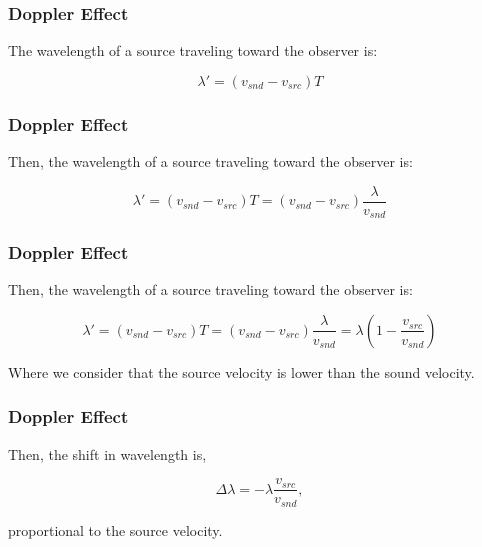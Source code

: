 \documentclass[]{beamer}
\begin{document}

\begin{frame}
\frametitle{Doppler Effect}


The wavelength of a source traveling toward the observer is:

\begin{equation}
\lambda'=(v_{snd}-v_{src})T
\end{equation}


  \end{frame}

\begin{frame}
\frametitle{Doppler Effect}


Then, the wavelength of a source traveling toward the observer is:

\begin{equation}
\lambda'=(v_{snd}-v_{src})T=(v_{snd}-v_{src})\frac{\lambda}{v_{snd}}
\end{equation}


  \end{frame}

\begin{frame}
\frametitle{Doppler Effect}


Then, the wavelength of a source traveling toward the observer is:

\begin{equation}
\lambda'=(v_{snd}-v_{src})T=(v_{snd}-v_{src})\frac{\lambda}{v_{snd}}=\lambda(1-\frac{v_{src}}{v_{snd}})
\end{equation}

\pause

\vspace{5mm}

Where we consider that the source velocity is lower than the sound velocity. 
  \end{frame}


\begin{frame}
\frametitle{Doppler Effect}


Then, the shift in wavelength is,

\pause
\begin{equation}
\Delta \lambda=-\lambda \frac{v_{src}}{v_{snd}},
\end{equation}
\pause

proportional to the source velocity.

  \end{frame}
\end{document}
